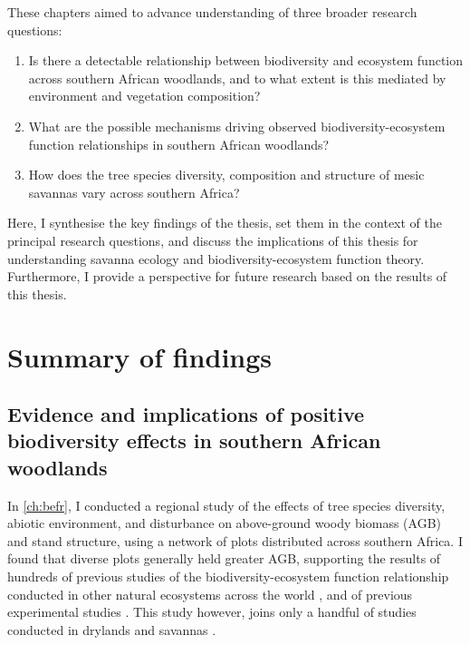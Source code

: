 \begin{refsection}
These chapters aimed to advance understanding of three broader research questions:

\begin{enumerate}
\item{Is there a detectable relationship between biodiversity and ecosystem function across southern African woodlands, and to what extent is this mediated by environment and vegetation composition?}
\item{What are the possible mechanisms driving observed biodiversity-ecosystem function relationships in southern African woodlands?}
\item{How does the tree species diversity, composition and structure of mesic savannas vary across southern Africa?}
\end{enumerate}

Here, I synthesise the key findings of the thesis, set them in the context of the principal research questions, and discuss the implications of this thesis for understanding savanna ecology and biodiversity-ecosystem function theory. Furthermore, I provide a perspective for future research based on the results of this thesis.

\section{Summary of findings}
\label{discussion:sec:summ}

\subsection{Evidence and implications of positive biodiversity effects in southern African woodlands}
\label{discussion:ssec:ecology}

In \autoref{ch:befr}, I conducted a regional study of the effects of tree species diversity, abiotic environment, and disturbance on above-ground woody biomass (AGB) and stand structure, using a network of plots distributed across southern Africa. I found that diverse plots generally held greater AGB, supporting the results of hundreds of previous studies of the biodiversity-ecosystem function relationship conducted in other natural ecosystems across the world \citep{Plas2019}, and of previous experimental studies \citep{Tilman2014}. This study however, joins only a handful of studies conducted in drylands and savannas \citep{Maestre2012, Grace2016, Plas2019, Clarke2017}. 


\end{refsection}
